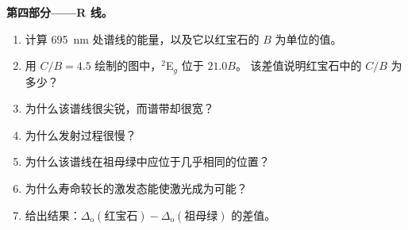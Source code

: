\begin{problem}
\medskip\noindent\textbf{第四部分——R 线。}
\begin{enumerate}[resume]
  \item 计算 \qty{695}{nm} 处谱线的能量，以及它以红宝石的 $B$ 为单位的值。
  \item 用 $C/B = 4.5$ 绘制的图中，$^2$E$_g$ 位于 $21.0B$。
        该差值说明红宝石中的 $C/B$ 为多少？
  \item 为什么该谱线很尖锐，而谱带却很宽？
  \item 为什么发射过程很慢？
  \item 为什么该谱线在祖母绿中应位于几乎相同的位置？
  \item 为什么寿命较长的激发态能使激光成为可能？
  \item 给出结果：$\Delta_{\mathrm o}(\text{红宝石}) - \Delta_{\mathrm o}(\text{祖母绿})$ 的差值。
\end{enumerate}
\end{problem}
